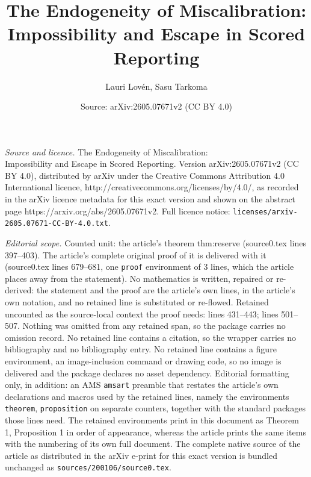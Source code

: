 \documentclass[10pt,a4paper]{amsart}
\title{The Endogeneity of Miscalibration: \\ Impossibility and Escape in Scored Reporting}
\author{Lauri Lov\'{e}n, Sasu Tarkoma}
\date{Source: arXiv:2605.07671v2 (CC BY 4.0)}
\begin{document}
\maketitle

\noindent\emph{Source and licence.} The Endogeneity of Miscalibration: \\ Impossibility and Escape in Scored Reporting. Version arXiv:2605.07671v2 (CC BY 4.0), distributed by arXiv under the Creative Commons Attribution 4.0 International licence, http://creativecommons.org/licenses/by/4.0/, as recorded in the arXiv licence metadata for this exact version and shown on the abstract page https://arxiv.org/abs/2605.07671v2. Full licence notice: \texttt{licenses/arxiv-2605.07671-CC-BY-4.0.txt}.\par\smallskip

\noindent\textit{Editorial scope.} Counted unit: the article's theorem thm:reserve (source0.tex lines 397--403). The article's complete original proof of it is delivered with it (source0.tex lines 679--681, one \texttt{proof} environment of 3 lines, which the article places away from the statement). No mathematics is written, repaired or re-derived: the statement and the proof are the article's own lines, in the article's own notation, and no retained line is substituted or re-flowed.  Retained uncounted as the source-local context the proof needs: lines 431--443; lines 501--507.  Nothing was omitted from any retained span, so the package carries no omission record.  No retained line contains a citation, so the wrapper carries no bibliography and no bibliography entry.  No retained line contains a figure environment, an image-inclusion command or drawing code, so no image is delivered and the package declares no asset dependency.  Editorial formatting only, in addition: an AMS \texttt{amsart} preamble that restates the article's own declarations and macros used by the retained lines, namely the environments \texttt{theorem}, \texttt{proposition} on separate counters, together with the standard packages those lines need.  The retained environments print in this document as Theorem 1, Proposition 1 in order of appearance, whereas the article prints the same items with the numbering of its own full document.  The complete native source of the article as distributed in the arXiv e-print for this exact version is bundled unchanged as \texttt{sources/200106/source0.tex}.
\end{document}
